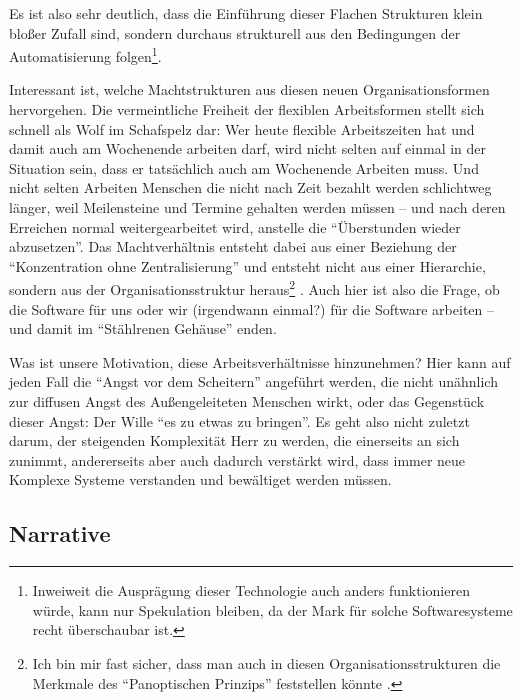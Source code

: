 Es ist also sehr deutlich, dass die Einführung dieser Flachen Strukturen klein bloßer Zufall sind, sondern durchaus strukturell aus den Bedingungen der Automatisierung folgen\footnote{Inweiweit die Ausprägung dieser Technologie auch anders funktionieren würde, kann nur Spekulation bleiben, da der Mark für solche Softwaresysteme recht überschaubar ist\parencite[173]{arbeitsfrei}.}.

Interessant ist, welche Machtstrukturen aus diesen neuen Organisationsformen hervorgehen.
Die vermeintliche Freiheit der flexiblen Arbeitsformen stellt sich schnell als Wolf im Schafspelz dar: Wer heute flexible Arbeitszeiten hat und damit auch am Wochenende arbeiten darf, wird nicht selten auf einmal in der Situation sein, dass er tatsächlich auch am Wochenende Arbeiten muss. Und nicht selten Arbeiten Menschen die nicht nach Zeit bezahlt werden schlichtweg länger, weil Meilensteine und Termine gehalten werden müssen – und nach deren Erreichen normal weitergearbeitet wird, anstelle die \enquote{Überstunden wieder abzusetzen}.
Das Machtverhältnis entsteht dabei aus einer Beziehung der \enquote{Konzentration ohne Zentralisierung} und entsteht nicht aus einer Hierarchie, sondern aus der Organisationsstruktur heraus\footnote{Ich bin mir fast sicher, dass man auch in diesen Organisationsstrukturen die Merkmale des \enquote{Panoptischen Prinzips} feststellen könnte \parencite{foucault}.} \parencite[70]{sennett}.
Auch hier ist also die Frage, ob die Software für uns oder wir (irgendwann einmal?) für die Software arbeiten – und damit im \enquote{Stählrenen Gehäuse} enden.

Was ist unsere Motivation, diese Arbeitsverhältnisse hinzunehmen?
Hier kann auf jeden Fall die \enquote{Angst vor dem Scheitern} angeführt werden\parencite[159ff.]{sennett}, die nicht unähnlich zur diffusen Angst des Außengeleiteten Menschen wirkt, oder das Gegenstück dieser Angst: Der Wille \enquote{es zu etwas zu bringen}.
Es geht also nicht zuletzt darum, der steigenden Komplexität Herr zu werden, die einerseits an sich zunimmt, andererseits aber auch dadurch verstärkt wird, dass immer neue Komplexe Systeme verstanden und bewältiget werden müssen.


\subsection{Narrative}

